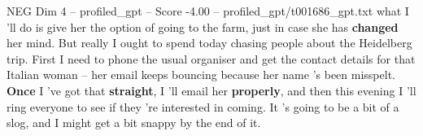 \begin{textsample}{NEG Dim 4 – profiled\_gpt – Score -4.00 – profiled\_gpt/t001686\_gpt.txt}  \label{ex:f4_neg_001}
what I 'll do is give her the option of going to the farm, just in case she has \textbf{changed} her mind.
But really I ought to spend today chasing people about the Heidelberg trip.
First I need to phone the usual organiser and get the contact details for that Italian woman – her email keeps bouncing because her name ’s been misspelt. \textbf{Once} I ’ve got that \textbf{straight}, I ’ll email her \textbf{properly}, and then this evening I ’ll ring everyone to see if they ’re interested in coming.
It ’s going to be a bit of a slog, and I might get a bit snappy by the end of it.

\end{textsample}
